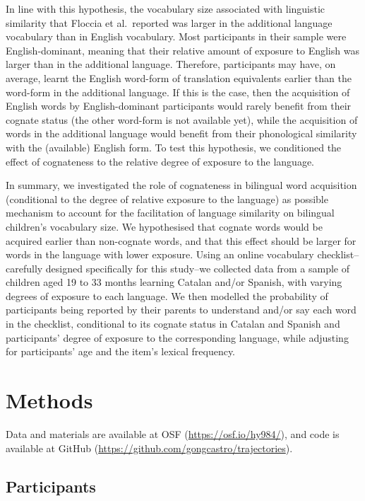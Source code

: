 \documentclass[
  english,
  man,man,floatsintext]{apa6}
\begin{document}
In line with this hypothesis, the vocabulary size associated with linguistic similarity that Floccia et al.~reported was larger in the additional language vocabulary than in English vocabulary. Most participants in their sample were English-dominant, meaning that their relative amount of exposure to English was larger than in the additional language. Therefore, participants may have, on average, learnt the English word-form of translation equivalents earlier than the word-form in the additional language. If this is the case, then the acquisition of English words by English-dominant participants would rarely benefit from their cognate status (the other word-form is not available yet), while the acquisition of words in the additional language would benefit from their phonological similarity with the (available) English form. To test this hypothesis, we conditioned the effect of cognateness to the relative degree of exposure to the language.

In summary, we investigated the role of cognateness in bilingual word acquisition (conditional to the degree of relative exposure to the language) as possible mechanism to account for the facilitation of language similarity on bilingual children's vocabulary size. We hypothesised that cognate words would be acquired earlier than non-cognate words, and that this effect should be larger for words in the language with lower exposure. Using an online vocabulary checklist--carefully designed specifically for this study--we collected data from a sample of children aged 19 to 33 months learning Catalan and/or Spanish, with varying degrees of exposure to each language. We then modelled the probability of participants being reported by their parents to understand and/or say each word in the checklist, conditional to its cognate status in Catalan and Spanish and participants' degree of exposure to the corresponding language, while adjusting for participants' age and the item's lexical frequency.

\hypertarget{methods}{%
\section{Methods}\label{methods}}

Data and materials are available at OSF (\url{https://osf.io/hy984/}), and code is available at GitHub (\url{https://github.com/gongcastro/trajectories}).

\hypertarget{participants}{%
\subsection{Participants}\label{participants}}
\end{document}
